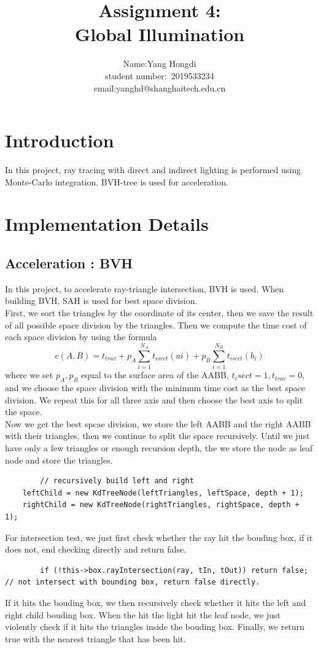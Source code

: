 \documentclass[acmtog]{acmart}
\title{Assignment 4:\\ {Global Illumination}}
\author{Name:\quad Yang Hongdi  \\ student number:\ 2019533234
\\email:\quad yanghd@shanghaitech.edu.cn}
\begin{document}
\maketitle

\vspace*{2 ex}

\section{Introduction}
In this project, ray tracing with direct and indirect lighting is performed using Monte-Carlo integration. BVH-tree is used for acceleration.
\section{Implementation Details}
\subsection{Acceleration : BVH}
	In this project, to accelerate ray-triangle intersection, BVH is used. When building BVH, SAH is used for best space division.\\
	First, we sort the triangles by the coordinate of its center, then we save the result of all possible space division by the triangles. Then we compute the time cost of each space division
	by using the formula $$c(A,B) = t_{trav} + p_A\sum_{i=1}^{N_A}t_{isect}(ai) + p_B\sum_{i=1}^{N_B}t_{isect}(b_i)$$
	where we set $p_A,p_B$ equal to the surface area of the AABB, $t_isect = 1, t_{trav} = 0$, and we choose the space division with the minimum time cost as the 
	best space division. We repeat this for all three axis and then choose the best axis to split the space.\\
	Now we get the best spcae division, we store the left AABB and the right AABB with their triangles, then we continue to split the space recursively.
	Until we just have only a few triangles or enough recursion depth, the we store the node as leaf node and store the triangles.
	\begin{lstlisting}
		// recursively build left and right
    leftChild = new KdTreeNode(leftTriangles, leftSpace, depth + 1);
    rightChild = new KdTreeNode(rightTriangles, rightSpace, depth + 1);
	\end{lstlisting} 
	For intersection test, we just first check whether the ray hit the bouding box, if it does not, end checking directly and return false.
	\begin{lstlisting}
		if (!this->box.rayIntersection(ray, tIn, tOut)) return false; // not intersect with bounding box, return false directly.
	\end{lstlisting}
	If it hits the bouding box, we then recursively check whether it hits the left and right child bouding box. When the hit the light hit the leaf node, we just
	violently check if it hits the triangles inside the bouding box. Finally, we return true with the nearest triangle that has been hit.
\end{document}
